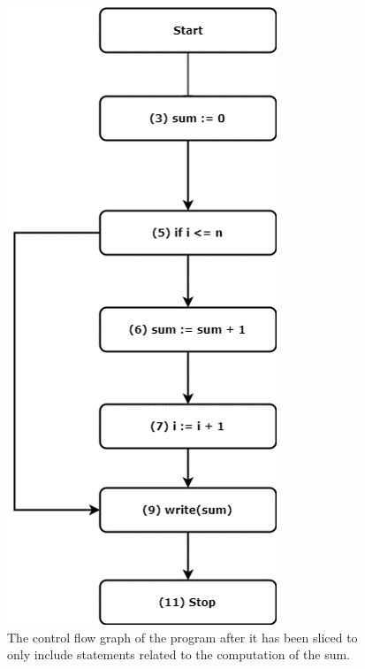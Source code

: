 \documentclass[peerreview]{IEEEtran}
\begin{document}
\begin{figure}[!h]
\centering
\includegraphics[width=0.8\columnwidth]{CFGAfter} 
\caption{The control flow graph of the program after it has been sliced to only include statements related to the computation of the sum.}
\label{fig_sim}
\end{figure}

\end{document}
